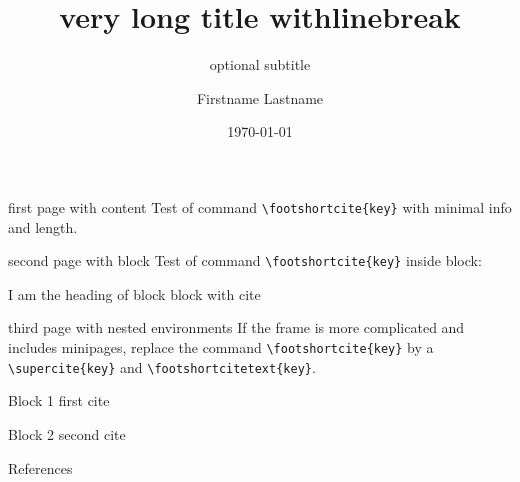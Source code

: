 \documentclass{jdbeamer169}
\author{Firstname Lastname}
\title[short title]{very long title with\newline linebreak} %
\subtitle{optional subtitle}
\institute{Institute for Numerical Mathematics}
\date{\today}
\begin{document}
\frame[plain]{\titlepage}

\begin{frame}{first page with content}
    Test of command \texttt{\textbackslash footshortcite\{key\}} with minimal info and length.
\end{frame}

\begin{frame}{second page with block}
    Test of command \texttt{\textbackslash footshortcite\{key\}} inside block: 
    \begin{block}{I am the heading of block}
	block with cite
    \end{block}
\end{frame}

\begin{frame}{third page with nested environments}
    If the frame is more complicated and includes minipages, replace the command \texttt{\textbackslash footshortcite\{key\}} by 
    a \texttt{\textbackslash supercite\{key\}} and \texttt{\textbackslash footshortcitetext\{key\}}.
    \begin{minipage}[b]{0.4\textwidth}
	\begin{block}{Block 1}
	    first cite\supercite{article01}
	\end{block}
    \end{minipage}
    \hfill
    \begin{minipage}[b]{0.4\textwidth}
	\begin{block}{Block 2}
	    second cite\supercite{article02}
	\end{block}
    \end{minipage}
\end{frame}

\begin{frame}{References}
    \printbibliography
\end{frame}
\end{document}
